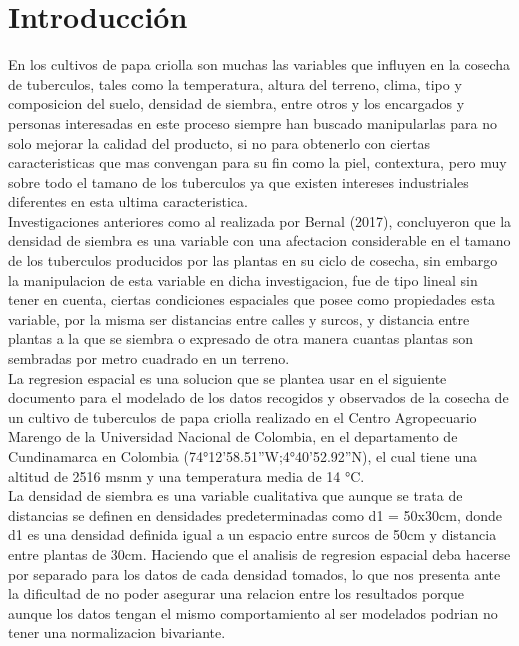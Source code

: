 

\chapter*{Introducci\'on}

En los cultivos de papa criolla son muchas las variables que influyen en la cosecha de tuberculos, tales como la temperatura, altura del terreno, clima, tipo y composicion del suelo, densidad de siembra, entre otros y los encargados y personas interesadas en este proceso siempre han buscado manipularlas para no solo mejorar la calidad del producto, si no para obtenerlo con ciertas caracteristicas que mas convengan para su fin como la piel, contextura, pero muy sobre todo el tamano de los tuberculos ya que existen intereses industriales diferentes en esta ultima caracteristica.\\

Investigaciones anteriores como al realizada por Bernal (2017), concluyeron que la densidad de siembra es una variable con una afectacion considerable en el tamano de los tuberculos producidos por las plantas en su ciclo de cosecha, sin embargo la manipulacion de esta variable en dicha investigacion, fue de tipo lineal sin tener en cuenta, ciertas condiciones espaciales que posee como propiedades esta variable, por la misma ser distancias entre calles y surcos, y distancia entre plantas a la que se siembra o expresado de otra manera cuantas plantas son sembradas por metro cuadrado en un terreno.\\

La regresion espacial es una solucion que se plantea usar en el siguiente documento para el modelado de los datos recogidos y observados de la cosecha de un cultivo de tuberculos de papa criolla realizado en el Centro Agropecuario Marengo de la Universidad Nacional de Colombia, en el departamento de Cundinamarca en Colombia (74°12'58.51''W;4°40'52.92''N), el cual tiene una altitud de 2516 msnm y una temperatura media de 14 °C.\\

La densidad de siembra es una variable cualitativa que aunque se trata de distancias se definen en densidades predeterminadas como d1 = 50x30cm, donde d1 es una densidad definida igual a un espacio entre surcos de 50cm y distancia entre plantas de 30cm. Haciendo que el analisis de regresion espacial deba hacerse por separado para los datos de cada densidad tomados, lo que nos presenta ante la dificultad de no poder asegurar una relacion entre los resultados porque aunque los datos tengan el mismo comportamiento al ser modelados podrian no tener una normalizacion bivariante.\\

